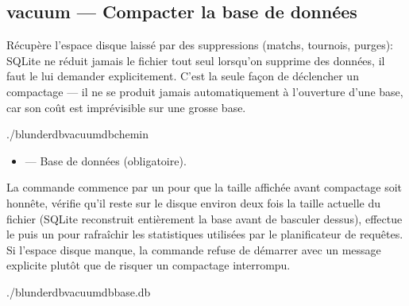 \documentclass[letterpaper,10pt,french]{sphinxmanual}
\begin{document}
\subsection{vacuum — Compacter la base de données}
\label{\detokenize{cli:vacuum-compacter-la-base-de-donnees}}
\sphinxAtStartPar
Récupère l’espace disque laissé par des suppressions (matchs, tournois,
purges): SQLite ne réduit jamais le fichier tout seul lorsqu’on supprime des
données, il faut le lui demander explicitement. C’est la seule façon de
déclencher un compactage — il ne se produit jamais automatiquement à
l’ouverture d’une base, car son coût est imprévisible sur une grosse base.

\begin{sphinxVerbatim}[commandchars=\\\{\}]
./blunderdbvacuum\PYGZhy{}\PYGZhy{}db\PYGZlt{}chemin\PYGZgt{}
\end{sphinxVerbatim}

\sphinxAtStartPar
{}
\begin{itemize}
\item {} 
\sphinxAtStartPar
{} — Base de données (obligatoire).

\end{itemize}

\sphinxAtStartPar
La commande commence par un  pour que la taille
affichée avant compactage soit honnête, vérifie qu’il reste sur le disque
environ deux fois la taille actuelle du fichier (SQLite reconstruit
entièrement la base avant de basculer dessus), effectue le  puis un
 pour rafraîchir les statistiques utilisées par le planificateur de
requêtes. Si l’espace disque manque, la commande refuse de démarrer avec un
message explicite plutôt que de risquer un compactage interrompu.

\sphinxAtStartPar
{}

\begin{sphinxVerbatim}[commandchars=\\\{\}]
./blunderdbvacuum\PYGZhy{}\PYGZhy{}dbbase.db

\end{sphinxVerbatim}
\end{document}
